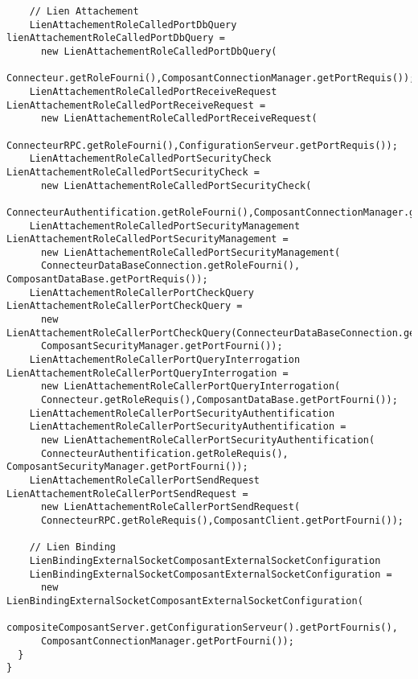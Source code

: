 \documentclass[11pt, a4paper, notitlepage]{article}
\begin{document}
\begin{lstlisting}
    // Lien Attachement
    LienAttachementRoleCalledPortDbQuery lienAttachementRoleCalledPortDbQuery =
      new LienAttachementRoleCalledPortDbQuery(
      Connecteur.getRoleFourni(),ComposantConnectionManager.getPortRequis());
    LienAttachementRoleCalledPortReceiveRequest LienAttachementRoleCalledPortReceiveRequest =
      new LienAttachementRoleCalledPortReceiveRequest(
      ConnecteurRPC.getRoleFourni(),ConfigurationServeur.getPortRequis());
    LienAttachementRoleCalledPortSecurityCheck LienAttachementRoleCalledPortSecurityCheck =
      new LienAttachementRoleCalledPortSecurityCheck(
      ConnecteurAuthentification.getRoleFourni(),ComposantConnectionManager.getPortRequis());
    LienAttachementRoleCalledPortSecurityManagement LienAttachementRoleCalledPortSecurityManagement =
      new LienAttachementRoleCalledPortSecurityManagement(
      ConnecteurDataBaseConnection.getRoleFourni(), ComposantDataBase.getPortRequis());
    LienAttachementRoleCallerPortCheckQuery LienAttachementRoleCallerPortCheckQuery =
      new LienAttachementRoleCallerPortCheckQuery(ConnecteurDataBaseConnection.getRoleRequis(),
      ComposantSecurityManager.getPortFourni());
    LienAttachementRoleCallerPortQueryInterrogation LienAttachementRoleCallerPortQueryInterrogation =
      new LienAttachementRoleCallerPortQueryInterrogation(
      Connecteur.getRoleRequis(),ComposantDataBase.getPortFourni());
    LienAttachementRoleCallerPortSecurityAuthentification
    LienAttachementRoleCallerPortSecurityAuthentification =
      new LienAttachementRoleCallerPortSecurityAuthentification(
      ConnecteurAuthentification.getRoleRequis(), ComposantSecurityManager.getPortFourni());
    LienAttachementRoleCallerPortSendRequest LienAttachementRoleCallerPortSendRequest =
      new LienAttachementRoleCallerPortSendRequest(
      ConnecteurRPC.getRoleRequis(),ComposantClient.getPortFourni());

    // Lien Binding
    LienBindingExternalSocketComposantExternalSocketConfiguration
    LienBindingExternalSocketComposantExternalSocketConfiguration =
      new LienBindingExternalSocketComposantExternalSocketConfiguration(
      compositeComposantServer.getConfigurationServeur().getPortFournis(),
      ComposantConnectionManager.getPortFourni());
  }
}
\end{lstlisting}
\end{document}
